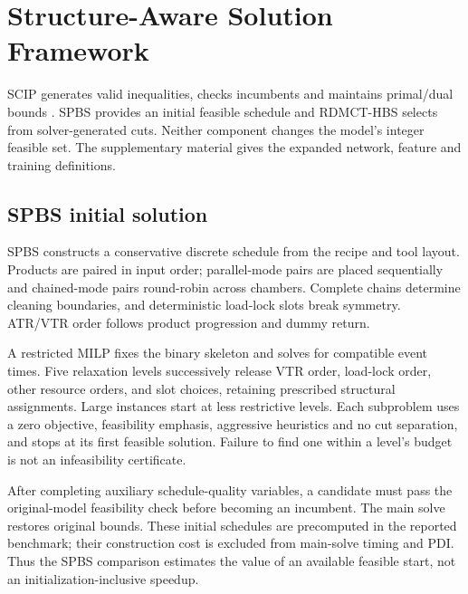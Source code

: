 \documentclass[journal]{IEEEtran}
\newcommand{\method}{RDMCT-HBS}
\begin{document}
\section{Structure-Aware Solution Framework}
\label{sec:method-new}
SCIP generates valid inequalities, checks incumbents and maintains primal/dual bounds \cite{achterberg2009scip,bestuzheva2023scip}. SPBS provides an initial feasible schedule and \method{} selects from solver-generated cuts. Neither component changes the model's integer feasible set. The supplementary material gives the expanded network, feature and training definitions.

\subsection{SPBS initial solution}
SPBS constructs a conservative discrete schedule from the recipe and tool layout. Products are paired in input order; parallel-mode pairs are placed sequentially and chained-mode pairs round-robin across chambers. Complete chains determine cleaning boundaries, and deterministic load-lock slots break symmetry. ATR/VTR order follows product progression and dummy return.

A restricted MILP fixes the binary skeleton and solves for compatible event times. Five relaxation levels successively release VTR order, load-lock order, other resource orders, and slot choices, retaining prescribed structural assignments. Large instances start at less restrictive levels. Each subproblem uses a zero objective, feasibility emphasis, aggressive heuristics and no cut separation, and stops at its first feasible solution. Failure to find one within a level's budget is not an infeasibility certificate.

After completing auxiliary schedule-quality variables, a candidate must pass the original-model feasibility check before becoming an incumbent. The main solve restores original bounds. These initial schedules are precomputed in the reported benchmark; their construction cost is excluded from main-solve timing and PDI. Thus the SPBS comparison estimates the value of an available feasible start, not an initialization-inclusive speedup.
\end{document}
